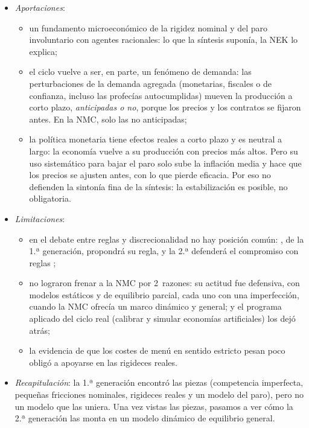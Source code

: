 \documentclass[11pt]{article}
\begin{document}
\begin{itemize}
\item \emph{Aportaciones}:
  \begin{itemize}
  \item un fundamento microeconómico de la rigidez nominal y del paro involuntario con agentes racionales: lo que la síntesis suponía, la NEK lo explica;
  \item el ciclo vuelve a ser, en parte, un fenómeno de demanda: las perturbaciones de la demanda agregada (monetarias, fiscales o de confianza, incluso las profecías autocumplidas) mueven la producción a corto plazo, \emph{anticipadas o no}, porque los precios y los contratos se fijaron antes. En la NMC, solo las no anticipadas\nocite{Lucas1972Expectations};
  \item la política monetaria tiene efectos reales a corto plazo y es neutral a largo: la economía vuelve a su producción con precios más altos. Pero su uso sistemático para bajar el paro solo sube la inflación media y hace que los precios se ajusten antes, con lo que pierde eficacia\nocite{BallMankiwRomer1988}. Por eso no defienden la sintonía fina de la síntesis: la estabilización es posible, no obligatoria.
  \end{itemize}
\item \emph{Limitaciones}:
  \begin{itemize}
  \item en el debate entre reglas y discrecionalidad no hay posición común: , de la 1.ª generación, propondrá su regla, y la 2.ª defenderá el compromiso con reglas ;
  \item no lograron frenar a la NMC por 2~razones\nocite{DeVroey2016History}: su actitud fue defensiva, con modelos estáticos y de equilibrio parcial, cada uno con una imperfección, cuando la NMC ofrecía un marco dinámico y general; y el programa aplicado del ciclo real (calibrar y simular economías artificiales) los dejó atrás;
  \item la evidencia de que los costes de menú en sentido estricto pesan poco\nocite{BlinderEtAl1998Asking} obligó a apoyarse en las rigideces reales.
  \end{itemize}
\item \emph{Recapitulación}: la 1.ª generación encontró las piezas (competencia imperfecta, pequeñas fricciones nominales, rigideces reales y un modelo del paro), pero no un modelo que las uniera. Una vez vistas las piezas, pasamos a ver cómo la 2.ª generación las monta en un modelo dinámico de equilibrio general.
\end{itemize}
\end{document}
